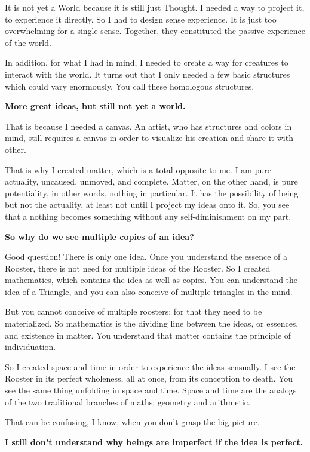 It is not yet a World because it is still just Thought. I needed a way to project it, to experience it directly. So I had to design sense experience. It is just too overwhelming for a single sense. Together, they constituted the passive experience of the world.

In addition, for what I had in mind, I needed to create a way for creatures to interact with the world. It turns out that I only needed a few basic structures which could vary enormously. You call these homologous structures.

\textbf{More great ideas, but still not yet a world.}


That is because I needed a canvas. An artist, who has structures and colors in mind, still requires a canvas in order to visualize his creation and share it with other.

That is why I created matter, which is a total opposite to me. I am pure actuality, uncaused, unmoved, and complete. Matter, on the other hand, is pure potentiality, in other words, nothing in particular. It has the possibility of being but not the actuality, at least not until I project my ideas onto it. So, you see that a nothing becomes something without any self-diminishment on my part.

\textbf{So why do we see multiple copies of an idea?}


Good question! There is only one idea. Once you understand the essence of a Rooster, there is not need for multiple ideas of the Rooster. So I created mathematics, which contains the idea as well as copies. You can understand the idea of a Triangle, and you can also conceive of multiple triangles in the mind.

But you cannot conceive of multiple roosters; for that they need to be materialized. So mathematics is the dividing line between the ideas, or essences, and existence in matter. You understand that matter contains the principle of individuation.

So I created space and time in order to experience the ideas sensually. I see the Rooster in its perfect wholeness, all at once, from its conception to death. You see the same thing unfolding in space and time. Space and time are the analogs of the two traditional branches of maths: geometry and arithmetic.

That can be confusing, I know, when you don't grasp the big picture.

\textbf{I still don't understand why beings are imperfect if the idea is perfect.}

